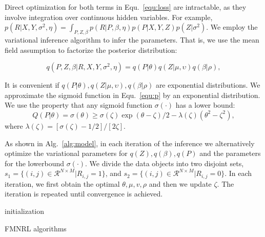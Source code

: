 \documentclass[sigconf,anonymous]{acmart}
\begin{document}
Direct optimization for both terms in Equ.~\ref{equ:loss} are intractable, as they involve integration over continuous hidden variables. For example, $p(R|X,Y,\sigma^2,\eta)=\int_{P,Z,\beta} p(R|P,\beta,\eta) p(P|X,Y,Z) p(Z|\sigma^2) $. We employ the variational inference algorithm to infer the parameters. That is, we use the mean field assumption to factorize the posterior distribution: 

\begin{equation}
    q(P,Z,\beta|R,X,Y,\sigma^{2},\eta) = q(P|\theta)q(Z|\mu,\upsilon)q(\beta|\rho),
\end{equation}

It is convenient if $q(P|\theta),q(Z|\mu,\upsilon),q(\beta|\rho)$ are exponential distributions. We approximate the sigmoid function in Equ.~\ref{equ:p} by an exponential distribution. We use the property that any sigmoid function $\sigma(\cdot)$ has a lower bound:
\begin{equation}
Q(P|\theta)=\sigma(\theta)\geq \sigma(\zeta)\exp{(\theta-\zeta)/2-\lambda(\zeta)(\theta^2-\zeta^2)},
\end{equation}
where $\lambda(\zeta)=[\sigma(\zeta)-1/2]/[2\zeta]$.

As shown in Alg.~\ref{alg:model}, in each iteration of the inference we alternatively optimize the variational parameters for $q(Z),q(\beta), q(P)$ and the parameters for the lowerbound $\sigma(\cdot)$. We divide the data objects into two disjoint sets, $s_1 = \{(i,j)\in \mathcal{R}^{N\times M}|R_{i,j}=1\}$, and $s_2= \{(i,j)\in \mathcal{R}^{N\times M}|R_{i,j}=0\}$. In each iteration, we first obtain the optimal $\theta,\mu,v,\rho$ and then we update $\zeta$. The iteration is repeated until convergence is achieved.



\begin{algorithm}
    \Output{$\mu$, $\upsilon$, $\rho$, $\theta$, $\zeta$}
    initialization\;
    \caption{FMNRL algorithms}\label{alg:model}
\end{algorithm}
\end{document}
